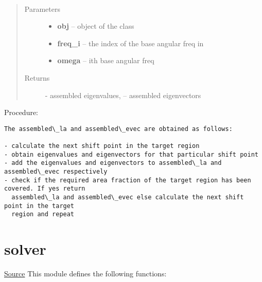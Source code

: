 \documentclass[letterpaper,10pt,english]{sphinxmanual}
\begin{document}
\begin{fulllineitems}
\label{index:brake.solve.qevp.brake_squeal_qevp}~\begin{quote}\begin{description}
\item[{Parameters}] \leavevmode\begin{itemize}
\item {} 
\textbf{obj} -- object of the class 

\item {} 
\textbf{freq\_i} -- the index of the base angular freq in

\item {} 
\textbf{omega} -- ith base angular freq

\end{itemize}

\item[{Returns}] \leavevmode
{} - assembled eigenvalues,  -- assembled eigenvectors

\end{description}\end{quote}

Procedure:

\begin{Verbatim}[commandchars=\\\{\}]
The assembled\_la and assembled\_evec are obtained as follows:
  
- calculate the next shift point in the target region
- obtain eigenvalues and eigenvectors for that particular shift point
- add the eigenvalues and eigenvectors to assembled\_la and assembled\_evec respectively
- check if the required area fraction of the target region has been covered. If yes return
  assembled\_la and assembled\_evec else calculate the next shift point in the target
  region and repeat
\end{Verbatim}

\end{fulllineitems}



\section{solver}
\label{index:solver}
\href{https://bitbucket.org/akadar/brakesqueal0.1/src/10fdbd0824e88ebbee4f44cefa781c01e586db41/brake/solve/solver.py?at=master}{Source}
\label{index:module-brake.solve.solver}
This module defines the following functions:
\end{document}
